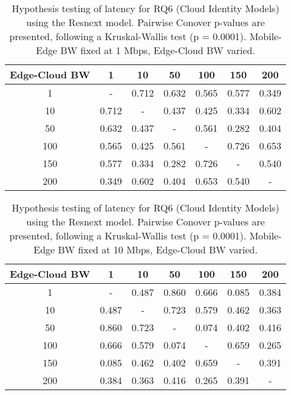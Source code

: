 \begin{table}[H]
\caption{Hypothesis testing of latency for RQ6 (Cloud Identity Models) using the Resnext model. Pairwise Conover p-values are presented, following a Kruskal-Wallis test (p = 0.0001). Mobile-Edge BW fixed at 1 Mbps, Edge-Cloud BW varied.}
\centering
\begin{tabular}{c|cccccc}
Edge-Cloud BW & 1 & 10 & 50 & 100 & 150 & 200 \\
\hline
1 & - & 0.712 & 0.632 & 0.565 & 0.577 & 0.349 \\
10 & 0.712 & - & 0.437 & 0.425 & 0.334 & 0.602 \\
50 & 0.632 & 0.437 & - & 0.561 & 0.282 & 0.404 \\
100 & 0.565 & 0.425 & 0.561 & - & 0.726 & 0.653 \\
150 & 0.577 & 0.334 & 0.282 & 0.726 & - & 0.540 \\
200 & 0.349 & 0.602 & 0.404 & 0.653 & 0.540 & - \\
\end{tabular}
\end{table}

\begin{table}[H]
\caption{Hypothesis testing of latency for RQ6 (Cloud Identity Models) using the Resnext model. Pairwise Conover p-values are presented, following a Kruskal-Wallis test (p = 0.0001). Mobile-Edge BW fixed at 10 Mbps, Edge-Cloud BW varied.}
\centering
\begin{tabular}{c|cccccc}
Edge-Cloud BW & 1 & 10 & 50 & 100 & 150 & 200 \\
\hline
1 & - & 0.487 & 0.860 & 0.666 & 0.085 & 0.384 \\
10 & 0.487 & - & 0.723 & 0.579 & 0.462 & 0.363 \\
50 & 0.860 & 0.723 & - & 0.074 & 0.402 & 0.416 \\
100 & 0.666 & 0.579 & 0.074 & - & 0.659 & 0.265 \\
150 & 0.085 & 0.462 & 0.402 & 0.659 & - & 0.391 \\
200 & 0.384 & 0.363 & 0.416 & 0.265 & 0.391 & - \\
\end{tabular}
\end{table}

